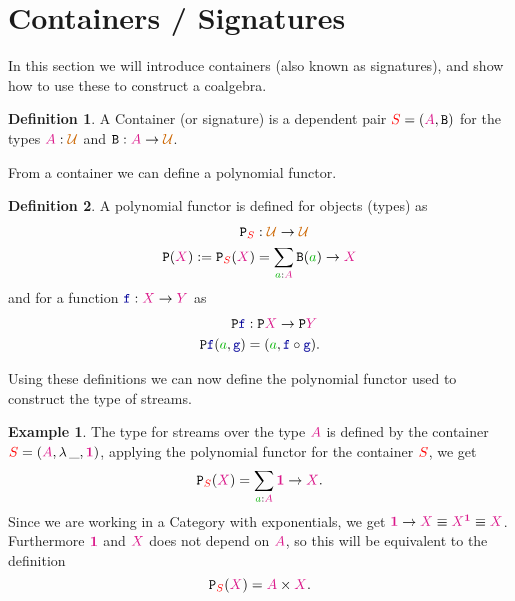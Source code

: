 \documentclass[twoside,11pt,openright]{report}
\theoremstyle{plain} %
\theoremstyle{definition}
\newtheorem{defn}{Definition}[section]
\newtheorem{exmp}{Example}[section]
\theoremstyle{remark}
\newcommand*{\term}[1]{\textcolor{green!70!black}{#1}} %
\newcommand*{\type}[1]{\textcolor{magenta!90!black}{#1}}
\newcommand*{\container}[1]{\textcolor{red}{#1}}
\newcommand*{\universe}[1]{\textcolor{orange!80!black}{#1}}
\newcommand*{\unit}{\type{\textbf{1}}}
\newcommand*{\function}[1]{\textcolor{blue!60!black}{\ensuremath{\mathtt{#1}}}}
\newcommand*{\typeformer}[1]{\ensuremath{\mathtt{#1}}}
\newcommand*{\functor}[1]{\ensuremath{\mathbf{\mathtt{#1}}}}
\begin{document}
\section{Containers / Signatures}
In this section we will introduce containers (also known as signatures), and show how to use these to construct a coalgebra. 
\begin{defn}
  A Container (or signature) is a dependent pair \(\container{S} = (\type{A},\typeformer{B})\) for the types \(\type{A} : \universe{\mathcal{U}}\) and \(\typeformer{B} : \type{A} \rightarrow \universe{\mathcal{U}}\).
\end{defn}
\noindent From a container we can define a polynomial functor.
\begin{defn}
  A polynomial functor is defined for objects (types) as
  \begin{equation}
    \begin{aligned}
      \functor{P}_{\container{S}} &: \universe{\mathcal{U}} \rightarrow \universe{\mathcal{U}} \\
      \functor{P}(\type{X}) := \functor{P}_{\container{S}}(\type{X}) &= \sum_{\term{a} : \type{A}} \typeformer{B}(\term{a}) \rightarrow \type{X}
    \end{aligned}
  \end{equation}
  and for a function \(\function{f} : \type{X} \rightarrow \type{Y}\) as
  \begin{equation}
    \begin{aligned}
      \functor{P}\function{f} &: \functor{P}\type{X} \rightarrow \functor{P}\type{Y} \\
      \functor{P}\function{f}(\term{a},\function{g}) &= (\term{a}, \function{f} \circ \function{g}).
    \end{aligned}
  \end{equation}
\end{defn}
\noindent Using these definitions we can now define the polynomial functor used to construct the type of streams.
\begin{exmp}
  The type for streams over the type \(\type{A}\) is defined by the container \(\container{S} = (\type{A},\lambda\,\_, \unit)\), applying the polynomial functor for the container \(\container{S}\), we get
  \begin{equation}
    \functor{P}_{\container{S}}(\type{X}) = \sum_{\term{a} : \type{A}} \unit \rightarrow \type{X}.
  \end{equation}
  Since we are working in a Category with exponentials, we get \(\unit \rightarrow \type{X} \equiv \type{X}^{\unit} \equiv \type{X}\). Furthermore \(\unit\) and \(\type{X}\) does not depend on \(\type{A}\), so this will be equivalent to the definition
  \begin{equation}
    \functor{P}_{\container{S}}(\type{X}) = \type{A} \times \type{X}.
  \end{equation}
\end{exmp}
\end{document}
